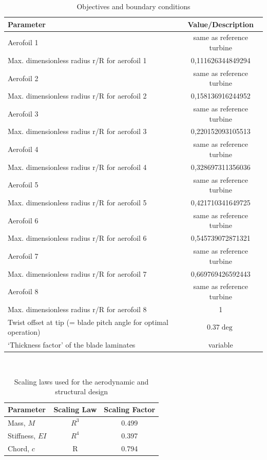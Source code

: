 \begin{table}[H]
\begin{center} 
\caption{Objectives and boundary conditions}\label{tab:rotordesign2}
\begin{tabular}{ |l|c| } 
\hline
\textbf{Parameter} & \textbf{Value/Description}  \\ 
\hline
Aerofoil 1 & same as reference turbine  \\ 
\hline
Max. dimensionless radius r/R for aerofoil 1 & 0,111626344849294 \\ 
\hline
Aerofoil 2 & same as reference turbine  \\
\hline
Max. dimensionless radius r/R for aerofoil 2 & 0,158136916244952 \\ 
\hline
Aerofoil 3 & same as reference turbine  \\
\hline
Max. dimensionless radius r/R for aerofoil 3 & 0,220152093105513 \\ 
\hline
Aerofoil 4 & same as reference turbine  \\
\hline
Max. dimensionless radius r/R for aerofoil 4 & 0,328697311356036 \\ 
\hline
Aerofoil 5 & same as reference turbine  \\
\hline
Max. dimensionless radius r/R for aerofoil 5 & 0,421710341649725 \\ 
\hline
Aerofoil 6 & same as reference turbine  \\
\hline
Max. dimensionless radius r/R for aerofoil 6 & 0,545739072871321 \\ 
\hline
Aerofoil 7 & same as reference turbine  \\
\hline
Max. dimensionless radius r/R for aerofoil 7 & 0,669769426592443 \\ 
\hline
Aerofoil 8 & same as reference turbine  \\
\hline
Max. dimensionless radius r/R for aerofoil 8 &  1\\ 
\hline
Twist offset at tip (= blade pitch angle for optimal operation) & $0.37 \deg$ \\
\hline
‘Thickness factor’ of the blade laminates & variable \\
\hline
\end{tabular} \\
\end{center}
\end{table}

\begin{table}[h]
\centering
\caption{Scaling laws used for the aerodynamic and structural design}
\label{tab:aero_struct_scaling}
\begin{tabular}{ |l|c|c| } 
\hline
\textbf{Parameter} & \textbf{Scaling Law} & \textbf{Scaling Factor}\\ 
\hline
Mass, $M$ & $R^3$ & 0.499 \\
\hline
Stiffness, $EI$ & $R^4$ & 0.397 \\
\hline
Chord, $c$ & R & 0.794\\
\hline
\end{tabular} \\
\end{table}

